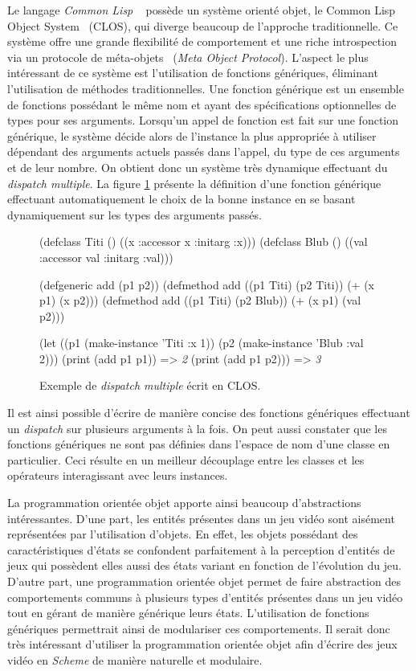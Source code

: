 \documentclass[12pt,twoside,letterpaper,francais]{book}
\newcommand{\clisp}{{\textit{Common Lisp }}}
\newcommand{\Schemelang}{{\textit{Scheme }}}
\newcommand{\schemeresult}[1]{{\it #1}}
\begin{document}
Le langage \clisp~\cite{CLISP} possède un système orienté objet, le
Common Lisp Object System~\cite{CLOS} (CLOS), qui diverge beaucoup de
l'approche traditionnelle. Ce système offre une grande flexibilité de
comportement et une riche introspection via un protocole de
méta-objets~\cite{MOP} (\textit{Meta Object Protocol}). L'aspect le
plus intéressant de ce système est l'utilisation de fonctions
génériques, éliminant l'utilisation de méthodes traditionnelles. Une
fonction générique est un ensemble de fonctions possédant le même nom
et ayant des spécifications optionnelles de types pour ses
arguments. Lorsqu'un appel de fonction est fait sur une fonction
générique, le système décide alors de l'instance la plus appropriée à
utiliser dépendant des arguments actuels passés dans l'appel, du type
de ces arguments et de leur nombre. On obtient donc un système très
dynamique effectuant du \textit{dispatch multiple}. La figure
\ref{OO:CLOS_ex} présente la définition d'une fonction générique
effectuant automatiquement le choix de la bonne instance en se basant
dynamiquement sur les types des arguments passés.\\

\begin{figure}[h!]
  \begin{schemecode}
(defclass Titi () ((x :accessor x :initarg :x)))
(defclass Blub () ((val :accessor val :initarg :val)))

(defgeneric add (p1 p2))
(defmethod add ((p1 Titi) (p2 Titi)) (+ (x p1) (x p2)))
(defmethod add ((p1 Titi) (p2 Blub)) (+ (x p1) (val p2)))

(let ((p1 (make-instance 'Titi :x 1))
      (p2 (make-instance 'Blub :val 2)))
  (print (add p1 p1))  => \schemeresult{2}
  (print (add p1 p2))) => \schemeresult{3}
  \end{schemecode}
  \caption{Exemple de \textit{dispatch multiple} écrit en CLOS.}
  \label{OO:CLOS_ex}
\end{figure}

Il est ainsi possible d'écrire de manière concise des fonctions
génériques effectuant un \textit{dispatch} sur plusieurs arguments à
la fois. On peut aussi constater que les fonctions génériques ne sont
pas définies dans l'espace de nom d'une classe en particulier. Ceci
résulte en un meilleur découplage entre les classes et les opérateurs
interagissant avec leurs instances.

La programmation orientée objet apporte ainsi beaucoup d'abstractions
intéressantes. D'une part, les entités présentes dans un jeu vidéo
sont aisément représentées par l'utilisation d'objets. En effet, les
objets possédant des caractéristiques d'états se confondent
parfaitement à la perception d'entités de jeux qui possèdent elles
aussi des états variant en fonction de l'évolution du jeu. D'autre
part, une programmation orientée objet permet de faire abstraction des
comportements communs à plusieurs types d'entités présentes dans un
jeu vidéo tout en gérant de manière générique leurs états.
L'utilisation de fonctions génériques permettrait ainsi de modulariser
ces comportements. Il serait donc très intéressant d'utiliser la
programmation orientée objet afin d'écrire des jeux vidéo en
\Schemelang de manière naturelle et modulaire.
\end{document}
